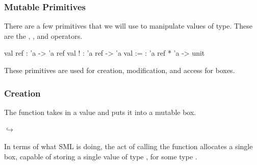 \documentclass[aspectratio=169]{beamer}
\begin{document}
\begin{frame}[fragile]
  \frametitle{Mutable Primitives}

  There are a few primitives that we will use to manipulate values of 
  type. These are the , \code{!}, and \code{:=} operators.

  \pause
  \vspace{\fill}

  \begin{codeblock}
    val ref : 'a -> 'a ref
    val !   : 'a ref -> 'a
    val :=  : 'a ref * 'a -> unit
  \end{codeblock}

  \pause
  \vspace{\fill}

  These primitives are used for creation, modification, and access for 
  boxes.
\end{frame}

\begin{frame}[fragile]
  \frametitle{ Creation}

  The  function takes in a value and puts it into a mutable box.

  \pause
  \vspace{\fill}

  \begin{center}
    \begin{minipage}{0.15\textwidth}
      \centering
    \end{minipage}
    \pause
    \begin{minipage}{0.1\textwidth}
      \centering
      $\hookrightarrow$
    \end{minipage}
    \begin{minipage}{0.15\textwidth}
      \centering
    \end{minipage}
  \end{center}

  \pause
  \vspace{\fill}


  \pause
  \vspace{\fill}

  In terms of what SML is doing, the act of calling the  function
  allocates a single box, capable of storing a single value of type ,
  for some type .

  \pause
  \vspace{\fill}

\end{frame}
\end{document}

